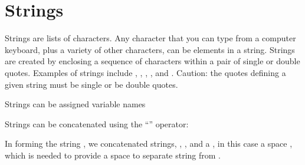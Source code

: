 \documentclass[letterpaper,10pt,english]{sphinxmanual}
\begin{document}
\ignorespaces 

\section{Strings}
\label{\detokenize{chap3/chap3_arrays:strings}}\label{\detokenize{chap3/chap3_arrays:index-4}}
\sphinxAtStartPar
Strings are lists of characters.  Any character that you can type from a computer keyboard, plus a variety of other characters, can be elements in a string.  Strings are created by enclosing a sequence of characters within a pair of single or double quotes.  Examples of strings include , , , , and .  Caution: the quotes defining a given string must  be single or  be double quotes.

\sphinxAtStartPar
Strings can be assigned variable names

\begin{sphinxVerbatim}[commandchars=\\\{\}]
  
  
\end{sphinxVerbatim}

\sphinxAtStartPar
Strings can be concatenated using the “\sphinxcode{\sphinxupquote{+}}” operator:

\begin{sphinxVerbatim}[commandchars=\\\{\}]
      
\end{sphinxVerbatim}

\sphinxAtStartPar
In forming the string , we concatenated  strings, , , and a , in this case a space , which is needed to provide a space to separate string  from .
\end{document}
